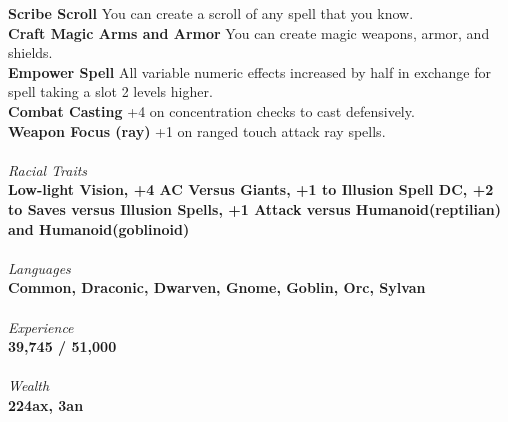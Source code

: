 \documentclass[letterpaper]{article}
\newcommand{\e}[1]{\emph{#1}}
\newcommand{\B}[1]{\textbf{#1}}
\begin{document}
\B{Scribe Scroll} You can create a scroll of any spell that you know. \\
\B{Craft Magic Arms and Armor} You can create magic weapons, armor, and shields. \\
\B{Empower Spell} All variable numeric effects increased by half in exchange for spell taking a slot 2 levels higher. \\
\B{Combat Casting} +4 on concentration checks to cast defensively. \\
\B{Weapon Focus (ray)} +1 on ranged touch attack ray spells. \\
\\
\e{Racial Traits} \\
\B{Low-light Vision, +4 AC Versus Giants, +1 to Illusion Spell DC, +2 to Saves versus Illusion Spells, +1 Attack versus Humanoid(reptilian) and Humanoid(goblinoid)} \\
\\
\e{Languages} \\
\B{Common, Draconic, Dwarven, Gnome, Goblin, Orc, Sylvan} \\
\\
{\e{Experience}} \\
\B{39,745 / 51,000} \\
\\
{\e{Wealth}} \\
\B{224ax, 3an}
\end{document}
